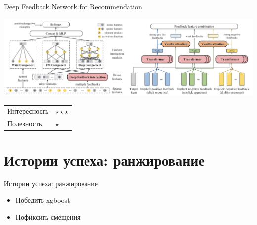 \documentclass[11pt,aspectratio=169]{beamer}
\begin{document}
\begin{frame}{Deep Feedback Network for Recommendation \cite{DFN}}

\begin{center}
\includegraphics[scale=0.3]{images/dfn.png}
\end{center}

\begin{tabular}{l l}
Интересность & $\star\star\star$ \\
Полезность & $\star$
\end{tabular}

\end{frame}

\section{Истории успеха: ранжирование}

\begin{frame}{Истории успеха: ранжирование}

\begin{tcolorbox}[colback=info!5,colframe=info!80,title=Как оставить след в науке]
\begin{itemize}
\item Победить xgboost
\item Пофиксить смещения
\end{itemize}
\end{tcolorbox}

\end{frame}
\end{document}
